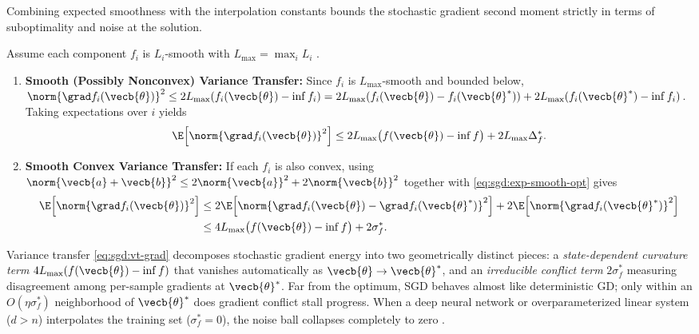 \documentclass[../../../../master.tex]{subfiles}
\begin{document}
Combining expected smoothness with the interpolation constants bounds the stochastic gradient second moment strictly in terms of suboptimality and noise at the solution.

\begin{coremath}
Assume each component $f_i$ is $L_i$-smooth with $L_{\max} = \max_i L_i$ .
\begin{enumerate}
  \item \textbf{Smooth (Possibly Nonconvex) Variance Transfer:} Since $f_i$ is $L_{\max}$-smooth and bounded below, $\norm{\grad f_i(\vecb{\theta})}^2 \le 2L_{\max}(f_i(\vecb{\theta}) - \inf f_i) = 2L_{\max}(f_i(\vecb{\theta}) - f_i(\vecb{\theta}^*)) + 2L_{\max}(f_i(\vecb{\theta}^*) - \inf f_i)$. Taking expectations over $i$ yields
  \begin{equation}
  \label{eq:sgd:vt-func}
  \E\Bigl[\norm{\grad f_i(\vecb{\theta})}^2\Bigr] \le 2L_{\max}\bigl(f(\vecb{\theta}) - \inf f\bigr) + 2L_{\max}\Delta_f^*.
  \end{equation}
  \item \textbf{Smooth Convex Variance Transfer:} If each $f_i$ is also convex, using $\norm{\vecb{a}+\vecb{b}}^2 \le 2\norm{\vecb{a}}^2 + 2\norm{\vecb{b}}^2$ together with \eqref{eq:sgd:exp-smooth-opt} gives
  \begin{align}
  \E\Bigl[\norm{\grad f_i(\vecb{\theta})}^2\Bigr]
  &\le 2\E\Bigl[\norm{\grad f_i(\vecb{\theta}) - \grad f_i(\vecb{\theta}^*)}^2\Bigr] + 2\E\Bigl[\norm{\grad f_i(\vecb{\theta}^*)}^2\Bigr] \nonumber \\
  &\le 4L_{\max}\bigl(f(\vecb{\theta}) - \inf f\bigr) + 2\sigma_f^*. \label{eq:sgd:vt-grad}
  \end{align}
\end{enumerate}
\end{coremath}

\begin{intuition}
Variance transfer \eqref{eq:sgd:vt-grad} decomposes stochastic gradient energy into two geometrically distinct pieces: a \emph{state-dependent curvature term} $4L_{\max}(f(\vecb{\theta}) - \inf f)$ that vanishes automatically as $\vecb{\theta} \to \vecb{\theta}^*$, and an \emph{irreducible conflict term} $2\sigma_f^*$ measuring disagreement among per-sample gradients at $\vecb{\theta}^*$. Far from the optimum, SGD behaves almost like deterministic GD; only within an $O(\eta\sigma_f^*)$ neighborhood of $\vecb{\theta}^*$ does gradient conflict stall progress. When a deep neural network or overparameterized linear system ($d > n$) interpolates the training set ($\sigma_f^* = 0$), the noise ball collapses completely to zero .
\end{intuition}
\end{document}
